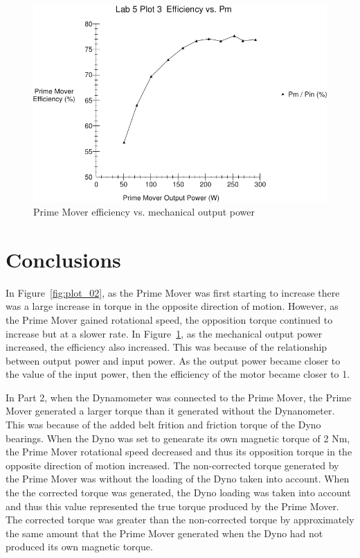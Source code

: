 \documentclass{article}
\begin{document}
\begin{figure}[H]
  \centering
  \includegraphics[width=\textwidth]{img/plot3}
  \caption{Prime Mover efficiency vs. mechanical output power}
  \label{fig:plot_03}
\end{figure}

\section{Conclusions}
In Figure~\ref{fig:plot_02}, as the Prime Mover was first starting to increase there was a large increase
in torque in the opposite direction of motion. However, as the Prime Mover gained rotational speed, the
opposition torque continued to increase but at a slower rate. In Figure~\ref{fig:plot_03}, as the mechanical
output power increased, the efficiency also increased. This was because of the relationship between output
power and input power. As the output power became closer to the value of the input power, then the efficiency
of the motor became closer to 1.

In Part 2, when the Dynamometer was connected to the Prime Mover, the Prime Mover generated a larger torque
than it generated without the Dynanometer. This was because of the added belt frition and friction torque of the
Dyno bearings. When the Dyno was set to genearate its own magnetic torque of 2 Nm, the Prime Mover rotational speed
decreased and thus its opposition torque in the opposite direction of motion increased. The non-corrected torque
generated by the Prime Mover was without the loading of the Dyno taken into account. When the the corrected
torque was generated, the Dyno loading was taken into account and thus this value represented the true torque
produced by the Prime Mover. The corrected torque was greater than the non-corrected torque by approximately the
same amount that the Prime Mover generated when the Dyno had not produced its own magnetic torque.
\end{document}

